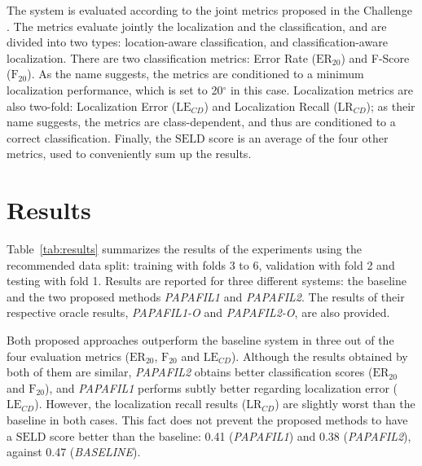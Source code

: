 The system is evaluated according to the joint metrics proposed in the Challenge \cite{Mesaros_2019_WASPAA}. 
The metrics evaluate jointly the localization and the classification, and are divided into two types: location-aware classification, and classification-aware localization. 
There are two classification metrics: Error Rate ($\text{ER}_{20}$) and F-Score ($\text{F}_{20}$). As the name suggests, the metrics are conditioned to a minimum localization performance, which is set to 20$^{\circ}$ in this case.
Localization metrics are also two-fold: Localization Error ($\text{LE}_{CD}$) and Localization Recall ($\text{LR}_{CD}$); 
as their name suggests, the metrics are class-dependent, and thus are conditioned to a correct classification.
Finally, the $\text{SELD}$ score is an average of the four other metrics, used to conveniently sum up the results. 




\section{Results}
\label{sec:results}

Table~\ref{tab:results} summarizes the results of the experiments using the recommended data split: training with folds 3 to 6, validation with fold 2 and testing with fold 1. 
Results are reported for three different systems: the baseline and the two proposed methods \textit{PAPAFIL1} and \textit{PAPAFIL2}.
The results of their respective oracle results, \textit{PAPAFIL1-O} and \textit{PAPAFIL2-O}, are also provided. 

Both proposed approaches outperform the baseline system in three out of the four evaluation metrics ($\text{ER}_{20}$, $\text{F}_{20}$ and $\text{LE}_{CD}$). 
Although the results obtained by both of them are similar, \textit{PAPAFIL2} obtains better classification scores ($\text{ER}_{20}$ and $\text{F}_{20}$), and \textit{PAPAFIL1} performs subtly better regarding localization error ($\text{LE}_{CD}$).
However, the localization recall results ($\text{LR}_{CD}$) are slightly worst than the baseline in both cases. This fact does not prevent the proposed methods to have a $\text{SELD}$ score better than the baseline: 0.41 (\textit{PAPAFIL1}) and 0.38 (\textit{PAPAFIL2}), against 0.47 (\textit{BASELINE}).

